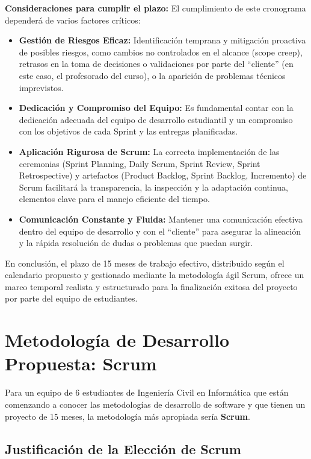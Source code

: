 \textbf{Consideraciones para cumplir el plazo:}
El cumplimiento de este cronograma dependerá de varios factores críticos:
\begin{itemize}
    \item \textbf{Gestión de Riesgos Eficaz:} Identificación temprana y mitigación proactiva de posibles riesgos, como cambios no controlados en el alcance (scope creep), retrasos en la toma de decisiones o validaciones por parte del ``cliente'' (en este caso, el profesorado del curso), o la aparición de problemas técnicos imprevistos.
    \item \textbf{Dedicación y Compromiso del Equipo:} Es fundamental contar con la dedicación adecuada del equipo de desarrollo estudiantil y un compromiso con los objetivos de cada Sprint y las entregas planificadas.
    \item \textbf{Aplicación Rigurosa de Scrum:} La correcta implementación de las ceremonias (Sprint Planning, Daily Scrum, Sprint Review, Sprint Retrospective) y artefactos (Product Backlog, Sprint Backlog, Incremento) de Scrum facilitará la transparencia, la inspección y la adaptación continua, elementos clave para el manejo eficiente del tiempo.
    \item \textbf{Comunicación Constante y Fluida:} Mantener una comunicación efectiva dentro del equipo de desarrollo y con el ``cliente'' para asegurar la alineación y la rápida resolución de dudas o problemas que puedan surgir.
\end{itemize}

En conclusión, el plazo de 15 meses de trabajo efectivo, distribuido según el calendario propuesto y gestionado mediante la metodología ágil Scrum, ofrece un marco temporal realista y estructurado para la finalización exitosa del proyecto por parte del equipo de estudiantes.





\section[Metodología de Desarrollo]{Metodología de Desarrollo Propuesta: Scrum}
Para un equipo de 6 estudiantes de Ingeniería Civil en Informática que están comenzando a conocer las metodologías de desarrollo de software y que tienen un proyecto de 15 meses, la metodología más apropiada sería \textbf{Scrum}.

\subsection*{Justificación de la Elección de Scrum}

